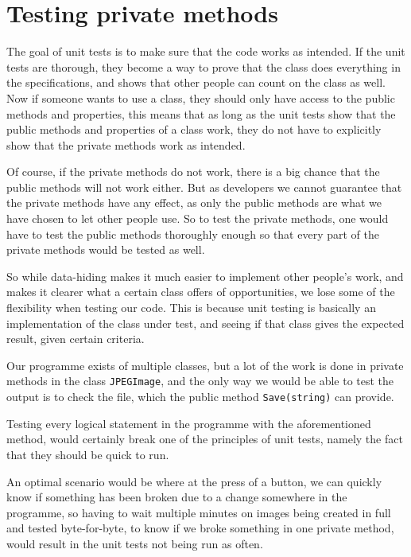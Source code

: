 \section{Testing private methods}
The goal of unit tests is to make sure that the code works as intended.
If the unit tests are thorough, they become a way to prove that the class does everything in the specifications, and shows that other people can count on the class as well.
Now if someone wants to use a class, they should only have access to the public methods and properties, this means that as long as the unit tests show that the public methods and properties of a class work, they do not have to explicitly show that the private methods work as intended.

Of course, if the private methods do not work, there is a big chance that the public methods will not work either.
But as developers we cannot guarantee that the private methods have any effect, as only the public methods are what we have chosen to let other people use. 
So to test the private methods, one would have to test the public methods thoroughly enough so that every part of the private methods would be tested as well. 

So while data-hiding makes it much easier to implement other people's work, and makes it clearer what a certain class offers of opportunities, we lose some of the flexibility when testing our code. This is because unit testing is basically an implementation of the class under test, and seeing if that class gives the expected result, given certain criteria. 

Our programme exists of multiple classes, but a lot of the work is done in private methods in the class \lstinline|JPEGImage|, and the only way we would be able to test the output is to check the file, which the public method \lstinline|Save(string)| can provide.

Testing every logical statement in the programme with the aforementioned method, would certainly break one of the principles of unit tests, namely the fact that they should be quick to run.

An optimal scenario would be where at the press of a button, we can quickly know if something has been broken due to a change somewhere in the programme, so having to wait multiple minutes on images being created in full and tested byte-for-byte, to know if we broke something in one private method, would result in the unit tests not being run as often. 


